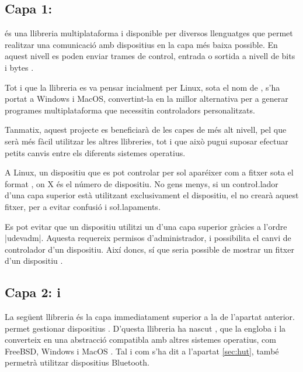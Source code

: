 

\subsection{Capa 1: }

 és una llibreria multiplataforma i disponible per diversos
llenguatges que permet realitzar una comunicació amb dispositius  en
la capa més baixa possible. En aquest nivell es poden enviar trames de control,
entrada o sortida a nivell de bits i bytes \cite{Libusb}.

Tot i que la llibreria es va pensar incialment per Linux, sota el nom de
 \cite{LinuxUsb}, s'ha portat a Windows i MacOS,
convertint-la en la millor alternativa per a generar programes multiplataforma
que necessitin controladors personalitzats.

Tanmatix, aquest projecte es beneficiarà de les capes de més alt nivell, pel que
serà més fàcil utilitzar les altres llibreries, tot i que això pugui suposar
efectuar petits canvis entre els diferents sistemes operatius.

A Linux, un dispositiu que es pot controlar per  sol aparéixer com
a fitxer sota el format , on X és el número de dispositiu.
No gens menys, si un contro\l.lador d'una capa superior està utilitzant
exclusivament el dispositiu, el  no crearà aquest fitxer, per a
evitar confusió i so\l.lapaments.

Es pot evitar que un dispositiu utilitzi un  d'una capa superior
gràcies a l'ordre \ord|udevadm|. Aquesta requereix permisos d'administrador, i
possibilita el canvi de controlador d'un dispositiu. Així doncs, sí que seria
possible de mostrar un fitxer  d'un dispositiu 
\cite{unbindingHid}.

\subsection{Capa 2:  i }

La següent llibreria és la capa immediatament superior a la de l'apartat
anterior.  permet gestionar dispositius . D'questa
llibreria ha nascut , que la engloba i la converteix en
una abstracció compatibla amb altres sistemes operatius, com
FreeBSD, Windows i MacOS \cite{Libhid}. Tal i com s'ha dit a 
l'apartat \ref{sec:hut}, també permetrà utilitzar dispositius Bluetooth.

